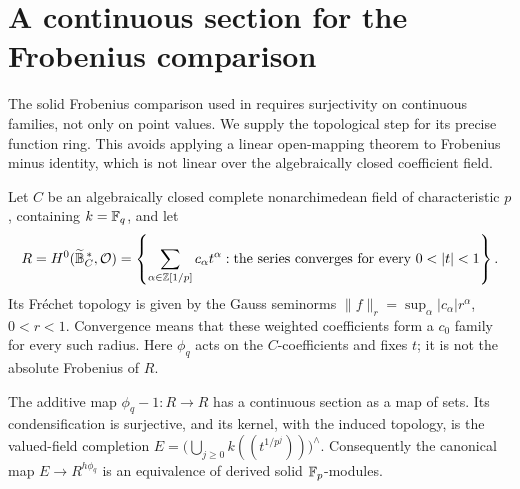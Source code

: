 \section{A continuous section for the Frobenius comparison}
\label{app:frobenius}

The solid Frobenius comparison used in
 requires surjectivity on continuous
families, not only on point values.  We supply the topological step for
its precise function ring.  This avoids applying a linear open-mapping
theorem to Frobenius minus identity, which is not linear over the
algebraically closed coefficient field.

Let $C$ be an algebraically closed complete nonarchimedean field of
characteristic $p$, containing $k=\mathbb F_q$, and let
\[
 R=H^0(\widetilde{\mathbb B}^{\,*}_C,\cO)
   =\left\{\sum_{\alpha\in\Z[1/p]}c_\alpha t^\alpha:
                 \text{the series converges for every }0<|t|<1\right\}.
\]
Its Fr\'echet topology is given by the Gauss seminorms
$\|f\|_r=\sup_\alpha |c_\alpha|r^\alpha$, $0<r<1$.
Convergence means that these weighted coefficients form a $c_0$ family
for every such radius.  Here $\phi_q$ acts on the $C$-coefficients
and fixes $t$; it is not the absolute Frobenius of $R$.

\begin{lemma}\label{lem:continuous-as-section}
The additive map $\phi_q-1:R\to R$ has a continuous section as a map
of sets.  Its condensification is surjective, and its kernel, with the
induced topology, is the valued-field completion
$E=\bigl(\bigcup_{j\ge0}k((t^{1/p^j}))\bigr)^{\wedge}$.
Consequently the canonical map $E\to R^{h\phi_q}$ is an equivalence
of derived solid $\mathbb F_p$-modules.
\end{lemma}

